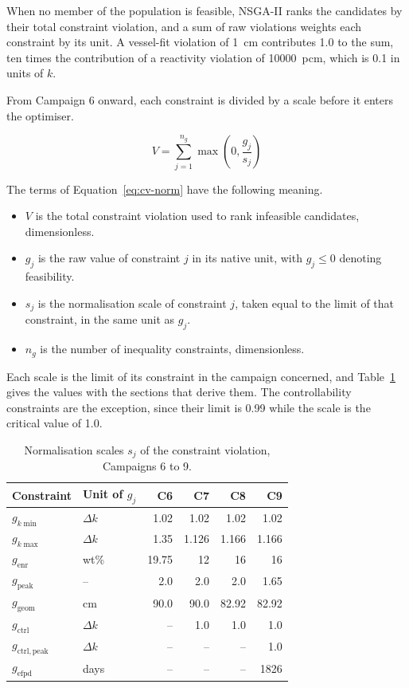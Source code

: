 When no member of the population is feasible,
NSGA-II ranks the candidates by their total constraint violation, and a
sum of raw violations weights each constraint by its unit. A vessel-fit
violation of \SI{1}{cm} contributes 1.0 to the sum, ten times the
contribution of a reactivity violation of \SI{10000}{pcm}, which is 0.1
in units of $k$.

From Campaign 6 onward, each constraint is divided by a scale before it
enters the optimiser.

\begin{equation}
  V = \sum_{j=1}^{n_g} \max\!\left(0, \frac{g_j}{s_j}\right)
  \label{eq:cv-norm}
\end{equation}

The terms of Equation~\eqref{eq:cv-norm} have the following meaning.

\begin{itemize}
  \item $V$ is the total constraint violation used to rank infeasible
    candidates, dimensionless.
  \item $g_j$ is the raw value of constraint $j$ in its native unit, with
    $g_j \leq 0$ denoting feasibility.
  \item $s_j$ is the normalisation scale of constraint $j$, taken equal to the
    limit of that constraint, in the same unit as $g_j$.
  \item $n_g$ is the number of inequality constraints, dimensionless.
\end{itemize}

Each scale is the limit of its constraint in the campaign concerned,
and Table~\ref{tab:cv-scales} gives the values with the sections that
derive them. The controllability constraints are the exception, since their
limit is 0.99 while the scale is the critical value of 1.0.

\begin{table}[htbp]
  \centering
  \small
  \caption{Normalisation scales $s_j$ of the constraint violation, Campaigns 6 to 9.}
  \label{tab:cv-scales}
  \begin{tabular}{@{}l l r r r r@{}}
    \toprule
    Constraint & Unit of $g_j$ & C6 & C7 & C8 & C9 \\
    \midrule
    $g_{k\min}$            & $\Delta k$ & 1.02  & 1.02  & 1.02  & 1.02  \\
    $g_{k\max}$            & $\Delta k$ & 1.35  & 1.126 & 1.166 & 1.166 \\
    $g_\mathrm{enr}$       & wt\%       & 19.75 & 12    & 16    & 16    \\
    $g_\mathrm{peak}$      & --         & 2.0   & 2.0   & 2.0   & 1.65  \\
    $g_\mathrm{geom}$      & cm         & 90.0  & 90.0  & 82.92 & 82.92 \\
    $g_\mathrm{ctrl}$      & $\Delta k$ & --    & 1.0   & 1.0   & 1.0   \\
    $g_\mathrm{ctrl,peak}$ & $\Delta k$ & --    & --    & --    & 1.0   \\
    $g_\mathrm{efpd}$      & days       & --    & --    & --    & 1826  \\
    \bottomrule
  \end{tabular}
\end{table}

